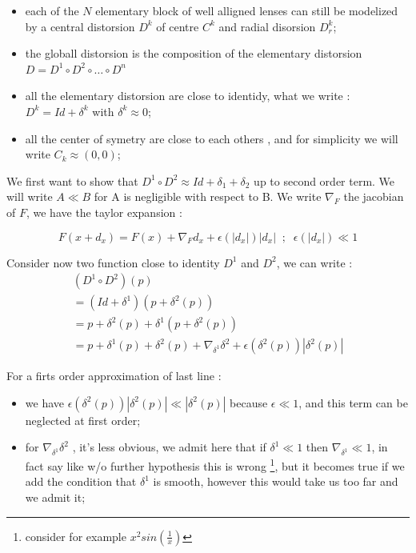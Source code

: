 \begin{itemize}
    \item  each of the $N$ elementary block of well alligned lenses can still be 
           modelized by a central distorsion $D^k$ of centre $C^k$ and radial
           disorsion $D^k_r$;

    \item  the globall distorsion is the composition of the elementary distorsion
           $ D = D^1 \circ D^2 \circ \dots \circ D^n$

    \item  all the elementary distorsion are close to identidy, what we write :
           $D^k = Id + \delta^k$  with $\delta^k \approx 0$;

    \item  all the center of symetry are close to each others , and for simplicity
           we will write $C_k \approx (0,0)$;
\end{itemize}


We first want to show that $D^1 \circ D^2  \approx Id + \delta_1 + \delta_2$ up to second order term.
We will write $A\ll B$ for A is negligible with respect to B. We write $\nabla_F$
the jacobian of $F$, we have the taylor expansion :

\begin{equation}
	F(x+d_x) = F(x) + \nabla_F d_x + \epsilon(|d_x|) |d_x|  \;\; ; \;\;  \epsilon(|d_x|) \ll 1
\end{equation}


Consider now two function close to identity $D^1$ and $D^2$, we can write :
\begin{equation}
\begin{multlined}
(D^1 \circ D^2)(p)  \\
=  (Id+\delta^1)(p+\delta^2(p))\\
=  p +\delta^2(p) + \delta^1(p+\delta^2(p)) \\
=  p +\delta^1(p) + \delta^2(p) + \nabla_{\delta^1} \delta^2   + \epsilon(\delta^2(p)) |\delta^2(p)|
\end{multlined}
\end{equation}

For a firts order approximation of last line :

\begin{itemize}
   \item we have $\epsilon(\delta^2(p)) |\delta^2(p)|  \ll |\delta^2(p)|$ because $\epsilon\ll 1$,
          and this term can be neglected at first order;

   \item  for  $ \nabla_{\delta^1} \delta^2$ , it's less obvious, we admit here that
          if $\delta^1 \ll 1$ then $ \nabla_{\delta^1} \ll 1$,  in fact say like w/o further hypothesis this
          is wrong \footnote{consider for example $x^2 sin(\frac{1}{x})$}, but it becomes
          true if we add the condition that $\delta^1$ is smooth, however this would take us too far  and we admit it;
\end{itemize}

